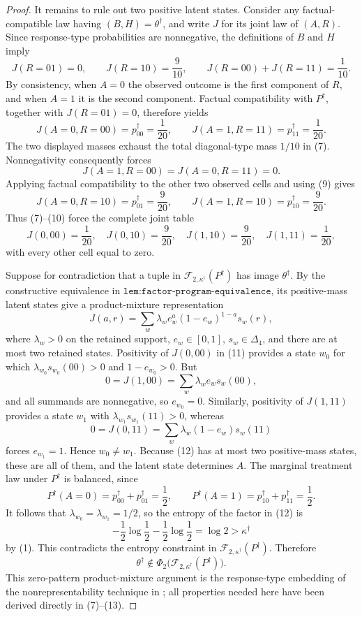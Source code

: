 \documentclass{article}
\begin{document}
\begin{proof}
It remains to rule out two positive latent states.  Consider any factual-compatible law having \((B,H)=\theta^\dagger\), and write \(J\) for its joint law of \((A,R)\).  Since response-type probabilities are nonnegative, the definitions of \(B\) and \(H\) imply
\[
J(R=01)=0,
\qquad
J(R=10)=\frac9{10},
\qquad
J(R=00)+J(R=11)=\frac1{10}.
\tag{7}
\]
By consistency, when \(A=0\) the observed outcome is the first component of \(R\), and when \(A=1\) it is the second component.  Factual compatibility with \(P^\dagger\), together with \(J(R=01)=0\), therefore yields
\[
J(A=0,R=00)=p^\dagger_{00}=\frac1{20},
\qquad
J(A=1,R=11)=p^\dagger_{11}=\frac1{20}.
\tag{8}
\]
The two displayed masses exhaust the total diagonal-type mass \(1/10\) in (7).  Nonnegativity consequently forces
\[
J(A=1,R=00)=J(A=0,R=11)=0.
\tag{9}
\]
Applying factual compatibility to the other two observed cells and using (9) gives
\[
J(A=0,R=10)=p^\dagger_{01}=\frac9{20},
\qquad
J(A=1,R=10)=p^\dagger_{10}=\frac9{20}.
\tag{10}
\]
Thus (7)--(10) force the complete joint table
\[
J(0,00)=\frac1{20},\quad
J(0,10)=\frac9{20},\quad
J(1,10)=\frac9{20},\quad
J(1,11)=\frac1{20},
\tag{11}
\]
with every other cell equal to zero.

Suppose for contradiction that a tuple in \(\mathcal F_{2,\kappa^\dagger}(P^\dagger)\) has image \(\theta^\dagger\).  By the constructive equivalence in \(\texttt{lem:factor-program-equivalence}\), its positive-mass latent states give a product-mixture representation
\[
J(a,r)=\sum_w\lambda_w e_w^a(1-e_w)^{1-a}s_w(r),
\tag{12}
\]
where \(\lambda_w>0\) on the retained support, \(e_w\in[0,1]\), \(s_w\in\Delta_4\), and there are at most two retained states.  Positivity of \(J(0,00)\) in (11) provides a state \(w_0\) for which \(\lambda_{w_0}s_{w_0}(00)>0\) and \(1-e_{w_0}>0\).  But
\[
0=J(1,00)=\sum_w\lambda_w e_ws_w(00),
\]
and all summands are nonnegative, so \(e_{w_0}=0\).  Similarly, positivity of \(J(1,11)\) provides a state \(w_1\) with \(\lambda_{w_1}s_{w_1}(11)>0\), whereas
\[
0=J(0,11)=\sum_w\lambda_w(1-e_w)s_w(11)
\]
forces \(e_{w_1}=1\).  Hence \(w_0\ne w_1\).  Because (12) has at most two positive-mass states, these are all of them, and the latent state determines \(A\).  The marginal treatment law under \(P^\dagger\) is balanced, since
\[
P^\dagger(A=0)=p^\dagger_{00}+p^\dagger_{01}=\frac12,
\qquad
P^\dagger(A=1)=p^\dagger_{10}+p^\dagger_{11}=\frac12.
\]
It follows that \(\lambda_{w_0}=\lambda_{w_1}=1/2\), so the entropy of the factor in (12) is
\[
-\frac12\log\frac12-\frac12\log\frac12=\log2>\kappa^\dagger
\tag{13}
\]
by (1).  This contradicts the entropy constraint in \(\mathcal F_{2,\kappa^\dagger}(P^\dagger)\).  Therefore
\[
\theta^\dagger\notin\Phi_2\bigl(\mathcal F_{2,\kappa^\dagger}(P^\dagger)\bigr).
\tag{14}
\]
This zero-pattern product-mixture argument is the response-type embedding of the nonrepresentability technique in \citet[Section V, Example 2 and Appendix A]{KumarLiElGamal2014}; all properties needed here have been derived directly in (7)--(13).


\end{proof}
\end{document}
